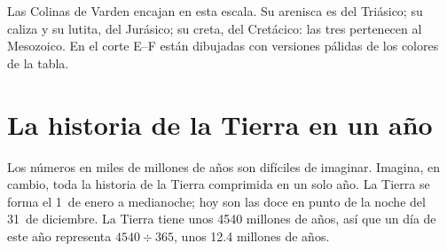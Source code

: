 Las Colinas de Varden encajan en esta escala. Su arenisca es del Triásico;
su caliza y su lutita, del Jurásico; su creta, del Cretácico: las tres
pertenecen al Mesozoico. En el corte E--F están dibujadas con versiones
pálidas de los colores de la tabla.

\section{La historia de la Tierra en un año}

Los números en miles de millones de años son difíciles de imaginar.
Imagina, en cambio, toda la historia de la Tierra comprimida en un solo
año. La Tierra se forma el 1~de enero a medianoche; hoy son las doce en
punto de la noche del 31~de diciembre. La Tierra tiene unos \num{4540}
millones de años, así que un día de este año representa $4540 \div 365$,
unos \num{12.4} millones de años.

